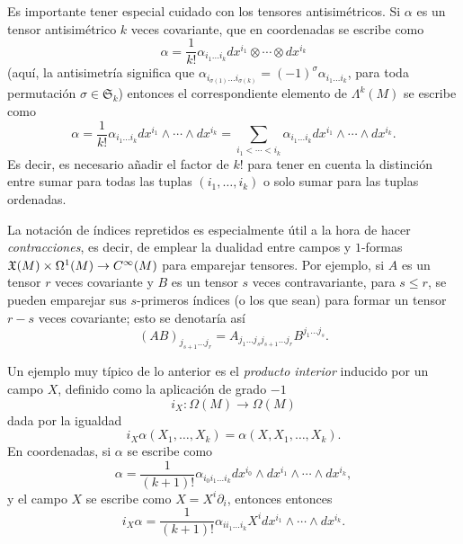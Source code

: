\documentclass[11pt,a4paper]{amsbook}
\theoremstyle{remark} \newtheorem{rmk}[subsection]{Observación}
\theoremstyle{definition} \newtheorem{defn}[subsection]{Definición}
\theoremstyle{definition} \newtheorem{ex}[subsection]{Ejemplo}
\theoremstyle{definition} \newtheorem{ej}[subsection]{Ejercicio}
\begin{document}
Es importante tener especial cuidado con los tensores antisimétricos. Si $\alpha$ es un tensor antisimétrico $k$ veces covariante, que en coordenadas se escribe como
\begin{equation*}
\alpha = \frac{1}{k!} \alpha_{i_1\dots i_k} dx^{i_1}\otimes \cdots \otimes dx^{i_k}
\end{equation*}
(aquí, la antisimetría significa que $\alpha_{i_{\sigma(1)} \dots i_{\sigma(k)}}=(-1)^\sigma \alpha_{i_1 \dots i_k}$, para toda permutación $\sigma \in \mathfrak{S}_k$) entonces el correspondiente elemento de $\Lambda^k(M)$ se escribe como
\begin{equation*}
\alpha = \frac{1}{k!} \alpha_{i_1 \dots i_k} dx^{i_1}\wedge \cdots \wedge dx^{i_k} = \sum_{i_1<\cdots <i_k} \alpha_{i_1 \dots i_k} dx^{i_1} \wedge \cdots \wedge dx^{i_k}.
\end{equation*}
Es decir, es necesario añadir el factor de $k!$ para tener en cuenta la distinción entre sumar para todas las tuplas $(i_1,\dots,i_k)$ o solo sumar para las tuplas ordenadas.

La notación de índices repretidos es especialmente útil a la hora de hacer \emph{contracciones}, es decir, de emplear la dualidad entre campos y $1$-formas $\mathfrak X(M)\times \Omega^1(M)\rightarrow C^\infty(M)$ para emparejar tensores. Por ejemplo, si $A$ es un tensor $r$ veces covariante y $B$ es un tensor $s$ veces contravariante, para $s\leq r$, se pueden emparejar sus $s$-primeros índices (o los que sean) para formar un tensor $r-s$ veces covariante; esto se denotaría así
\begin{equation*}
(AB)_{j_{s+1} \dots j_{r}} = A_{j_1 \dots j_s j_{s+1} \dots j_r} B^{j_1 \dots j_s}.
\end{equation*}

Un ejemplo muy típico de lo anterior es el \emph{producto interior} inducido por un campo $X$, definido como la aplicación de grado $-1$
\begin{equation*}
i_X: \Omega(M) \rightarrow \Omega(M)
\end{equation*}
dada por la igualdad
\begin{equation*}
i_X \alpha(X_1,\dots,X_k) = \alpha(X,X_1,\dots,X_k).
\end{equation*}
En coordenadas, si $\alpha$ se escribe como
\begin{equation*}
\alpha = \frac{1}{(k+1)!} \alpha_{i_0 i_1 \dots i_k} dx^{i_0} \wedge dx^{i_1} \wedge \cdots \wedge dx^{i_k},
\end{equation*}
y el campo $X$ se escribe como $X= X^i \partial_i$, entonces
entonces
\begin{equation*}
i_X\alpha =\frac{1}{(k+1)!} \alpha_{i i_1 \dots i_k} X^i dx^{i_1}\wedge \cdots \wedge dx^{i_k}.
\end{equation*}
\end{document}
